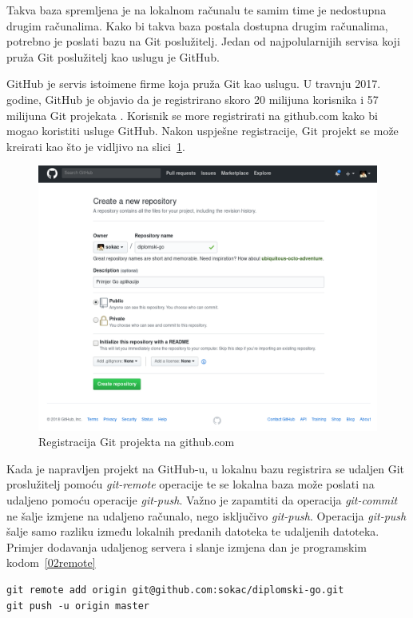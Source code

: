 Takva baza spremljena je na lokalnom računalu te samim time je nedostupna drugim računalima. Kako bi
takva baza postala dostupna drugim računalima, potrebno je poslati bazu na Git poslužitelj. Jedan
od najpolularnijih servisa koji pruža Git poslužitelj kao uslugu je GitHub.

GitHub je servis istoimene firme koja pruža Git kao uslugu. U travnju 2017. godine, GitHub je
objavio da je registrirano skoro 20 milijuna korisnika i 57 milijuna Git projekata
\citep{github2017}. Korisnik se more registrirati na github.com kako bi mogao koristiti usluge
GitHub. Nakon uspješne registracije, Git projekt se može kreirati kao što je vidljivo na
slici~\ref{fig:02hgreg}.

\begin{figure}[h]
    \centering
    \includegraphics[width=\linewidth]{img/02/gh.png}
    \caption{Registracija Git projekta na github.com}%
    \label{fig:02hgreg}
\end{figure}

Kada je napravljen projekt na GitHub-u, u lokalnu bazu registrira se udaljen Git proslužitelj pomoću
\textit{git-remote} operacije te se lokalna baza može poslati na udaljeno pomoću operacije
\textit{git-push}. Važno je zapamtiti da operacija \textit{git-commit} ne šalje izmjene na udaljeno
računalo, nego isključivo \textit{git-push}.  Operacija \textit{git-push} šalje samo razliku između
lokalnih predanih datoteka te udaljenih datoteka.  Primjer dodavanja udaljenog servera i slanje
izmjena dan je programskim kodom~\ref{02remote}

\begin{minipage}{\linewidth}
\begin{lstlisting}
git remote add origin git@github.com:sokac/diplomski-go.git
git push -u origin master
\end{lstlisting}
\end{minipage}

